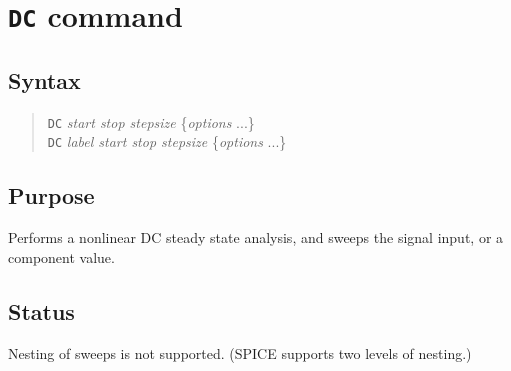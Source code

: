 %
%
%
%
\section{{\tt DC} command}
\subsection{Syntax}
\begin{verse}
{\tt DC} {\it start stop stepsize} \{{\it options} ...\}\\
{\tt DC} {\it label start stop stepsize} \{{\it options} ...\}
\end{verse}
\subsection{Purpose}

Performs a nonlinear DC steady state analysis, and sweeps the signal input,
or a component value.
\subsection{Status}

Nesting of sweeps is not supported.  (SPICE supports two
levels of nesting.)
